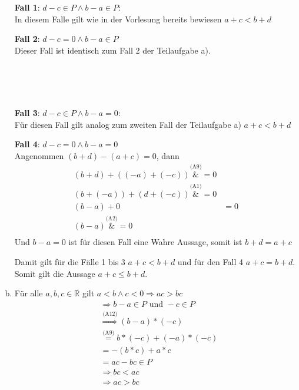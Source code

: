 \documentclass{article}
\begin{document}
\begin{enumerate}[a)]
  \begin{minipage}[t]{.45\textwidth}
    \textbf{Fall 1}: $d - c \in P \land b - a \in P$: \\
    
    In diesem Falle gilt wie in der Vorlesung bereits bewiesen
    $a + c < b + d$
  \end{minipage}
  \hfill
  \vrule
  \hfill
  \begin{minipage}[t]{.45\textwidth}
    \textbf{Fall 2}: $d - c = 0 \land b - a \in P$ \\
    
    Dieser Fall ist identisch zum Fall 2 der Teilaufgabe a).
  \end{minipage}
  \\ \\ \\ %
  \begin{minipage}[t]{.45\textwidth}
    \textbf{Fall 3}: $d - c \in P \land b - a = 0$: \\
    
    Für diesen Fall gilt analog zum zweiten Fall der Teilaufgabe a)
    $a + c < b + d$
  \end{minipage}
  \hfill
  \vrule
  \hfill
  \begin{minipage}[t]{.45\textwidth}
    \textbf{Fall 4}: $d - c = 0 \land b - a = 0$ \\

    Angenommen $(b + d) - (a + c) = 0$, dann
    \begin{align*}
      (b + d) + ((-a) + (-c)) \overset{\text{(A9)}}&{=} 0 \\
      (b + (-a)) + (d + (-c)) \overset{\text{(A1)}}&{=} 0 \\
      (b - a) + 0 &= 0 \\
      (b - a) \overset{\text{(A2)}}&{=} 0 \\
    \end{align*}
    Und $b - a = 0$ ist für diesen Fall eine Wahre Aussage, somit ist $b + d = a + c$
  \end{minipage}
  Damit gilt für die Fälle 1 bis 3 $a + c < b + d$ und für den Fall 4 $a + c = b + d$.
  Somit gilt die Aussage $a + c \leq b + d$.

\item Für alle $a, b, c \in \mathbb{R}$ gilt $a < b \land c < 0 \Rightarrow ac > bc$
  \begin{align*}
    &\Rightarrow b - a \in P \text{ und } -c \in P \\
    &\overset{\text{(A12)}}\Rightarrow (b - a) * (-c) \\
    &\overset{\text{(A9)}}= b * (-c)  + (-a) * (-c) \\
    &= -(b * c)  + a * c \\
    &= ac - bc \in P \\
    &\Rightarrow bc < ac \\
    &\Rightarrow ac > bc \\
  \end{align*}


\end{enumerate}
\end{document}
